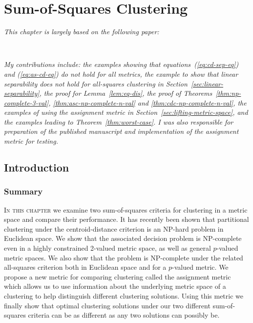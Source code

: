 \chapter{Sum-of-Squares Clustering}
\label{cha:sum-squar-clust}

\textit{This chapter is largely based on the following paper:}
\vspace{0.5em}

\noindent
{}\\



\vspace{1em}

\textit{\sffamily My contributions include: the examples showing that
  equations~(\ref{eq:cd-sep-eq}) and (\ref{eq:as-cd-eq}) do not hold for all
  metrics, the example to show that linear separability does not hold for
  all-squares clustering in Section~\ref{sec:linear-separability}, the proof
  for Lemma~\ref{lem:eq-dis}, the proof of
  Theorems~\ref{thm:np-complete-3-val}, \ref{thm:asc-np-complete-n-val} and
  \ref{thm:cdc-np-complete-n-val}, the examples of using the assignment metric
  in Section~\ref{sec:lifting-metric-space}, and the examples leading to
  Theorem~\ref{thm:worst-case}.  I was also responsible for preparation of the
  published manuscript and implementation of the assignment metric for
  testing.  }
\newpage

\section{Introduction}
\label{sec:ss-introduction}

\subsection{Summary}
\label{sec:summary-sum-squar}

\textsc{In this chapter} we examine two sum-of-squares criteria for clustering
in a metric space and compare their performance.  It has recently been shown
that partitional clustering under the centroid-distance criterion is an
NP-hard problem in Euclidean space.  We show that the associated decision
problem is NP-complete even in a highly constrained 2-valued metric space, as
well as general $p$-valued metric spaces.  We also show that the problem is
NP-complete under the related all-squares criterion both in Euclidean space
and for a $p$-valued metric.  We propose a new metric for comparing clustering
called the assignment metric which allows us to use information about the
underlying metric space of a clustering to help distinguish different
clustering solutions.  Using this metric we finally show that optimal
clustering solutions under our two different sum-of-squares criteria can be as
different as any two solutions can possibly be.

